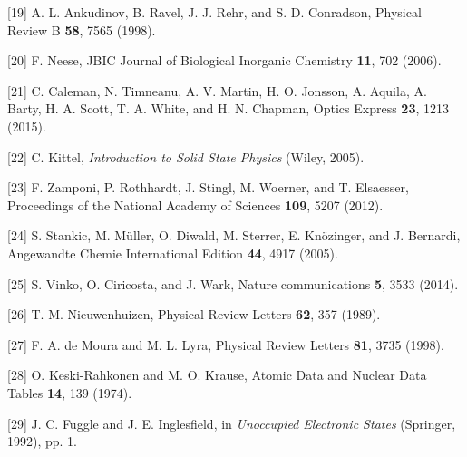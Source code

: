 {[}19{]} A. L. Ankudinov, B. Ravel, J. J. Rehr, and S. D. Conradson,
Physical Review B \textbf{58}, 7565 (1998).

{[}20{]} F. Neese, JBIC Journal of Biological Inorganic Chemistry
\textbf{11}, 702 (2006).

{[}21{]} C. Caleman, N. Timneanu, A. V. Martin, H. O. Jonsson, A.
Aquila, A. Barty, H. A. Scott, T. A. White, and H. N. Chapman, Optics
Express \textbf{23}, 1213 (2015).

{[}22{]} C. Kittel, \emph{Introduction to Solid State Physics} (Wiley,
2005).

{[}23{]} F. Zamponi, P. Rothhardt, J. Stingl, M. Woerner, and T.
Elsaesser, Proceedings of the National Academy of Sciences \textbf{109},
5207 (2012).

{[}24{]} S. Stankic, M. Müller, O. Diwald, M. Sterrer, E. Knözinger, and
J. Bernardi, Angewandte Chemie International Edition \textbf{44}, 4917
(2005).

{[}25{]} S. Vinko, O. Ciricosta, and J. Wark, Nature communications
\textbf{5}, 3533 (2014).

{[}26{]} T. M. Nieuwenhuizen, Physical Review Letters \textbf{62}, 357
(1989).

{[}27{]} F. A. de Moura and M. L. Lyra, Physical Review Letters
\textbf{81}, 3735 (1998).

{[}28{]} O. Keski-Rahkonen and M. O. Krause, Atomic Data and Nuclear
Data Tables \textbf{14}, 139 (1974).

{[}29{]} J. C. Fuggle and J. E. Inglesfield, in \emph{Unoccupied
Electronic States} (Springer, 1992), pp. 1.




